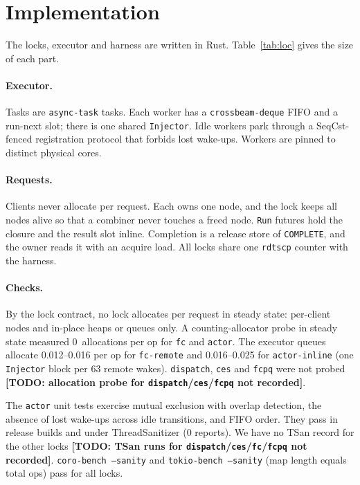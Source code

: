 \documentclass[10pt,twocolumn]{article}
\newcommand{\lk}[1]{\texttt{#1}}
\newcommand{\todo}[1]{{\color{red}\textbf{[TODO: #1]}}}
\begin{document}
\section{Implementation}\label{sec:impl}

The locks, executor and harness are written in Rust. Table~\ref{tab:loc}
gives the size of each part.

\paragraph{Executor.} Tasks are \lk{async-task} tasks. Each worker has a
\lk{crossbeam-deque} FIFO and a run-next slot; there is one shared
\lk{Injector}. Idle workers park through a SeqCst-fenced registration protocol
that forbids lost wake-ups. Workers are pinned to distinct physical cores.

\paragraph{Requests.} Clients never allocate per request. Each owns one node,
and the lock keeps all nodes alive so that a combiner never touches a freed
node. \lk{Run} futures hold the closure and the result slot inline.
Completion is a release store of \lk{COMPLETE}, and the owner reads it with an
acquire load. All locks share one \lk{rdtscp} counter with the harness.

\paragraph{Checks.} By the lock contract, no lock allocates per request in
steady state: per-client nodes and in-place heaps or queues only. A counting-allocator probe in steady state measured
0~allocations per op for \lk{fc} and \lk{actor}. The executor queues allocate
0.012--0.016 per op for \lk{fc-remote} and 0.016--0.025 for \lk{actor-inline} (one
\lk{Injector} block per 63 remote wakes). \lk{dispatch}, \lk{ces} and \lk{fcpq}
were not probed \todo{allocation probe for \lk{dispatch}/\lk{ces}/\lk{fcpq} not
recorded}.

The \lk{actor} unit tests exercise mutual exclusion with overlap detection, the
absence of lost wake-ups across idle transitions, and FIFO order. They pass in
release builds and under ThreadSanitizer (0 reports). We have no TSan record
for the other locks \todo{TSan runs for \lk{dispatch}/\lk{ces}/\lk{fc}/\lk{fcpq}
not recorded}. \lk{coro-bench --sanity} and \lk{tokio-bench --sanity} (map
length equals total ops) pass for all locks.
\end{document}
